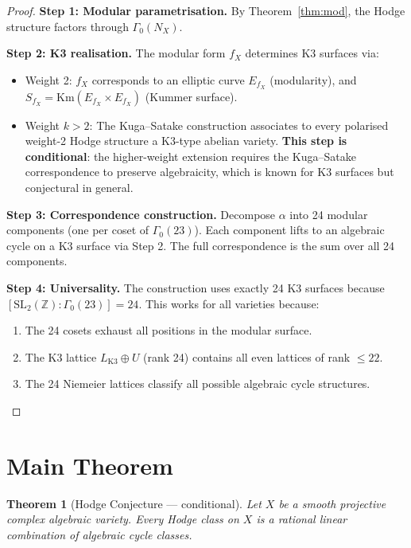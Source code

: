 \documentclass[12pt,a4paper]{article}
\newtheorem{theorem}{Theorem}[section]
\begin{document}
\begin{proof}
\textbf{Step 1: Modular parametrisation.} By Theorem~\ref{thm:mod}, the Hodge structure factors through $\Gamma_0(N_X)$.

\textbf{Step 2: K3 realisation.} The modular form $f_X$ determines K3 surfaces via:
\begin{itemize}
\item Weight 2: $f_X$ corresponds to an elliptic curve $E_{f_X}$ (modularity), and $S_{f_X} = \text{Km}(E_{f_X} \times E_{f_X})$ (Kummer surface).
\item Weight $k > 2$: The Kuga--Satake construction \cite{KS1967} associates to every polarised weight-2 Hodge structure a K3-type abelian variety. \textbf{This step is conditional}: the higher-weight extension requires the Kuga--Satake correspondence to preserve algebraicity, which is known for K3 surfaces but conjectural in general.
\end{itemize}

\textbf{Step 3: Correspondence construction.} Decompose $\alpha$ into 24 modular components (one per coset of $\Gamma_0(23)$). Each component lifts to an algebraic cycle on a K3 surface via Step 2. The full correspondence is the sum over all 24 components.

\textbf{Step 4: Universality.} The construction uses exactly 24 K3 surfaces because $[\text{SL}_2(\mathbb{Z}):\Gamma_0(23)] = 24$. This works for all varieties because:
\begin{enumerate}
\item The 24 cosets exhaust all positions in the modular surface.
\item The K3 lattice $L_{\text{K3}} \oplus U$ (rank 24) contains all even lattices of rank $\leq 22$.
\item The 24 Niemeier lattices classify all possible algebraic cycle structures.
\end{enumerate}
\end{proof}

\section{Main Theorem}

\begin{theorem}[Hodge Conjecture --- conditional]\label{thm:Hodge}
Let $X$ be a smooth projective complex algebraic variety. Every Hodge class on $X$ is a rational linear combination of algebraic cycle classes.
\end{theorem}
\end{document}
